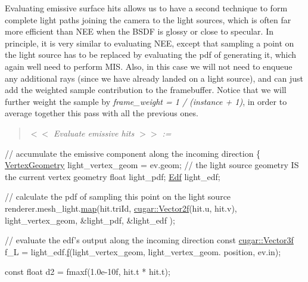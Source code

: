 \begin{DoxyParagraph}{}
Evaluating emissive surface hits allows us to have a second technique to form complete light paths joining the camera to the light sources, which is often far more efficient than N\+EE when the B\+S\+DF is glossy or close to specular. In principle, it is very similar to evaluating N\+EE, except that sampling a point on the light source has to be replaced by evaluating the pdf of generating it, which again we\textquotesingle{}ll need to perform M\+IS. Also, in this case we will not need to enqueue any additional rays (since we have already landed on a light source), and can just add the weighted sample contribution to the framebuffer. Notice that we will further weight the sample by {\itshape frame\+\_\+weight = 1 / (instance + 1)}, in order to average together this pass with all the previous ones. ~\newline
\label{_hello_renderer_page_Evaluate_emissive_hits_anchor}%
%
 \begin{quote}
{\itshape  $<$$<$ Evaluate emissive hits $>$$>$ \+:= }

\end{quote}

\begin{DoxyCodeInclude}
        \textcolor{comment}{// accumulate the emissive component along the incoming direction}
        \{
            \hyperlink{struct_vertex_geometry}{VertexGeometry}    light\_vertex\_geom = ev.geom; \textcolor{comment}{// the light source geometry IS
       the current vertex geometry}
            \textcolor{keywordtype}{float}           light\_pdf;
            \hyperlink{struct_edf}{Edf}              light\_edf;

            \textcolor{comment}{// calculate the pdf of sampling this point on the light source}
            renderer.mesh\_light.\hyperlink{group___lights_module_gaf14a70f7d23b422f8953bc55d1eade44}{map}(hit.triId, \hyperlink{structcugar_1_1_vector}{cugar::Vector2f}(hit.u, hit.v), 
      light\_vertex\_geom, &light\_pdf, &light\_edf );

            \textcolor{comment}{// evaluate the edf's output along the incoming direction}
            \textcolor{keyword}{const} \hyperlink{structcugar_1_1_vector}{cugar::Vector3f} f\_L = light\_edf.\hyperlink{structcugar_1_1_lambert_edf_aed2fed71aa6a7ad98e05714a0fd5f316}{f}(light\_vertex\_geom, light\_vertex\_geom.
      position, ev.in);

            \textcolor{keyword}{const} \textcolor{keywordtype}{float} d2 = fmaxf(1.0e-10f, hit.t * hit.t);


\end{DoxyCodeInclude}
\end{DoxyParagraph}
